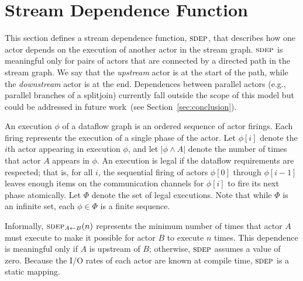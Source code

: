 \documentclass{sig-alternate}
\begin{document}

\section{Stream Dependence Function}
\label{sec:sdep}

This section defines a stream dependence function, $\textsc{sdep}$, that
describes how one actor depends on the execution of another actor in
the stream graph.  $\textsc{sdep}$ is meaningful only for pairs of actors that
are connected by a directed path in the stream graph.  We say that the
{\it upstream} actor is at the start of the path, while the {\it
downstream} actor is at the end.  Dependences between parallel actors
(e.g., parallel branches of a splitjoin) currently fall outside the
scope of this model but could be addressed in future work~(see
Section~\ref{sec:conclusion}).

An execution $\phi$ of a dataflow graph is an ordered sequence of
actor firings.  Each firing represents the execution of a single phase
of the actor.  Let $\phi[i]$ denote the $i$th actor appearing in
execution $\phi$, and let $|\phi \wedge A|$ denote the number of times
that actor $A$ appears in $\phi$.  An execution is legal if the
dataflow requirements are respected; that is, for all $i$, the
sequential firing of actors $\phi[0]$ through $\phi[i-1]$ leaves
enough items on the communication channels for $\phi[i]$ to fire its
next phase atomically.  Let $\Phi$ denote the set of legal executions.
Note that while $\Phi$ is an infinite set, each $\phi \in \Phi$ is a
finite sequence.

Informally, $\sdepf{A}{B}(n)$ represents the minimum number of times
that actor $A$ must execute to make it possible for actor $B$ to
execute $n$ times.  This dependence is meaningful only if $A$ is
upstream of $B$; otherwise, $\textsc{sdep}$ assumes a value of zero.  Because
the I/O rates of each actor are known at compile time, $\textsc{sdep}$ is a
static mapping.
\end{document}
